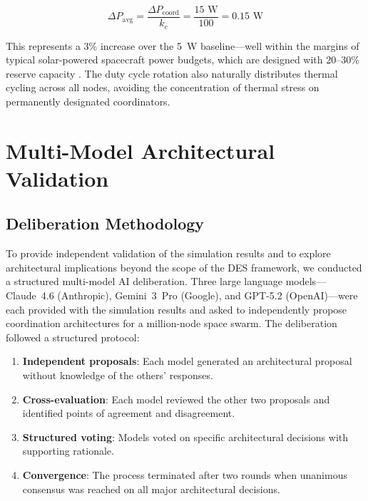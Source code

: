 \documentclass[journal]{IEEEtran}
\begin{document}
\begin{equation}
    \Delta P_{\text{avg}} = \frac{\Delta P_{\text{coord}}}{k_c} = \frac{15\text{~W}}{100} = 0.15\text{~W}
    \label{eq:power_overhead}
\end{equation}

This represents a 3\% increase over the 5~W baseline---well within the margins of typical solar-powered spacecraft power budgets, which are designed with 20--30\% reserve capacity \cite{wertz_smad}. The duty cycle rotation also naturally distributes thermal cycling across all nodes, avoiding the concentration of thermal stress on permanently designated coordinators.


\section{Multi-Model Architectural Validation}

\subsection{Deliberation Methodology}

To provide independent validation of the simulation results and to explore architectural implications beyond the scope of the DES framework, we conducted a structured multi-model AI deliberation. Three large language models---Claude~4.6 (Anthropic), Gemini~3~Pro (Google), and GPT-5.2 (OpenAI)---were each provided with the simulation results and asked to independently propose coordination architectures for a million-node space swarm. The deliberation followed a structured protocol:

\begin{enumerate}
    \item \textbf{Independent proposals}: Each model generated an architectural proposal without knowledge of the others' responses.
    \item \textbf{Cross-evaluation}: Each model reviewed the other two proposals and identified points of agreement and disagreement.
    \item \textbf{Structured voting}: Models voted on specific architectural decisions with supporting rationale.
    \item \textbf{Convergence}: The process terminated after two rounds when unanimous consensus was reached on all major architectural decisions.
\end{enumerate}
\end{document}
